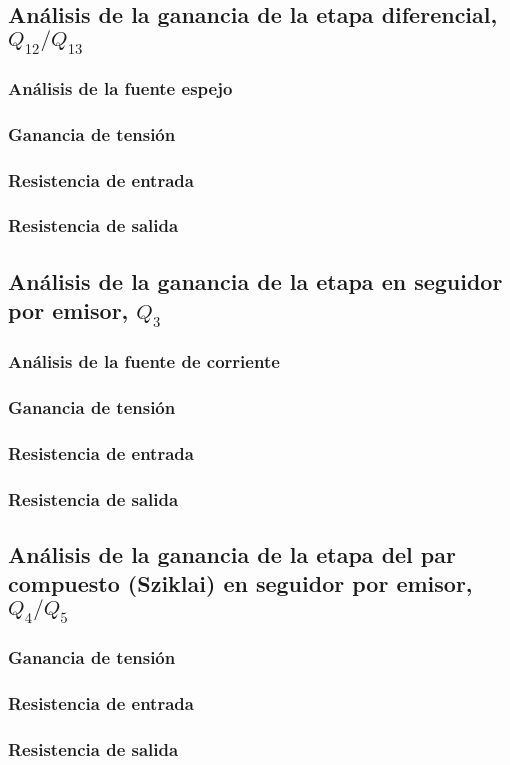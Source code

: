 \subsection{Análisis de la ganancia de la etapa diferencial, $Q_{12}/Q_{13}$}

\subsubsection{Análisis de la fuente espejo}

\subsubsection{Ganancia de tensión}

\subsubsection{Resistencia de entrada}

\subsubsection{Resistencia de salida}


\subsection{Análisis de la ganancia de la etapa en seguidor por emisor, $Q_{3}$}

\subsubsection{Análisis de la fuente de corriente}

\subsubsection{Ganancia de tensión}

\subsubsection{Resistencia de entrada}

\subsubsection{Resistencia de salida}


\subsection{Análisis de la ganancia de la etapa del par compuesto (Sziklai) en seguidor por emisor, $Q_{4}/Q_{5}$}

\subsubsection{Ganancia de tensión}

\subsubsection{Resistencia de entrada}

\subsubsection{Resistencia de salida}

